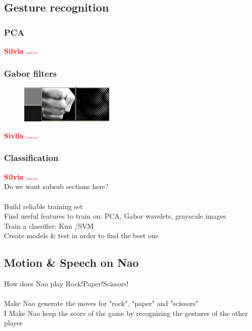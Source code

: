 \documentclass[a4paper, 11pt, twocolumn]{article}
\newcommand{\todo}[1]{\textcolor{red}{\textbf{#1}}}
\begin{document}
        \subsection{Gesture recognition}
		\label{sec:Meth_clssifyHands}
		\subsubsection{PCA}
		\todo{Silvia .....}\\

		\subsubsection{Gabor filters}
		\begin{figure}[!hbtp]
		   \centering
		   \includegraphics[width=0.4\textwidth]{gabor.jpg}
	   	\end{figure}

		\todo{Sivlia .....}\\

		\subsubsection{Classification}
		\todo{Silvia .....}\\


        Do we want subsub sections here?\\\\
        Build reliable training set\\
        Find useful features to train on: PCA, Gabor wavelets, grayscale images\\
        Train a classifier: Knn /SVM\\
        Create models \& test in order to find the best one\\
        
        \subsection{Motion \& Speech on Nao}
		\label{sec:Meth_naoPlay}
        How does Nao play Rock!Paper!Scissors!\\\\
        Make Nao generate the moves for "rock", "paper" and "scissors"\\
        I Make Nao keep the score of the game by recognizing the gestures of the
        other player
\end{document}
